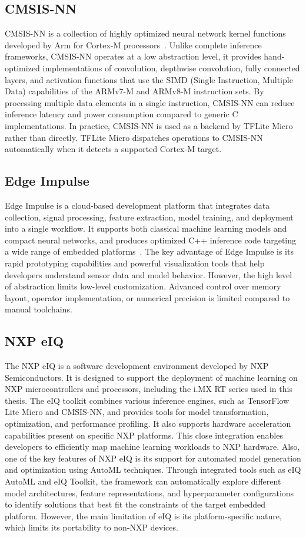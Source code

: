 \subsection{CMSIS-NN}

CMSIS-NN is a collection of highly optimized neural network kernel functions developed by Arm for Cortex-M processors~\cite{cmsisnn}. Unlike complete inference frameworks, CMSIS-NN operates at a low abstraction level, it provides hand-optimized implementations of convolution, depthwise convolution, fully connected layers, and activation functions that use the SIMD (Single Instruction, Multiple Data) capabilities of the ARMv7-M and ARMv8-M instruction sets. By processing multiple data elements in a single instruction, CMSIS-NN can reduce inference latency and power consumption compared to generic C implementations. 
In practice, CMSIS-NN is used as a backend by TFLite Micro rather than directly. TFLite Micro dispatches operations to CMSIS-NN automatically when it detects a supported Cortex-M target.

\subsection{Edge Impulse}
Edge Impulse is a cloud-based development platform that integrates data collection, signal processing, feature extraction, model training, and deployment into a single workflow. It supports both classical machine learning models and compact neural networks, and produces optimized C++ inference code targeting a wide range of embedded platforms~\cite{edgeimpulse}. The key advantage of Edge Impulse is its rapid prototyping capabilities and powerful visualization tools that help developers understand sensor data and model behavior. However, the high level of abstraction limits low-level customization. Advanced control over memory layout, operator implementation, or numerical precision is limited compared to manual toolchains.

\subsection{NXP eIQ}
The NXP eIQ is a software development environment developed by NXP Semiconductors. It is designed to support the deployment of machine learning on NXP microcontrollers and processors, including the i.MX RT series used in this thesis. The eIQ toolkit combines various inference engines, such as TensorFlow Lite Micro and CMSIS-NN, and provides tools for model transformation, optimization, and performance profiling. It also supports hardware acceleration capabilities present on specific NXP platforms. This close integration enables developers to efficiently map machine learning workloads to NXP hardware. Also, one of the key features of NXP eIQ is its support for automated model generation and optimization using AutoML techniques. Through integrated tools such as eIQ AutoML and eIQ Toolkit, the framework can automatically explore different model architectures, feature representations, and hyperparameter configurations to identify solutions that best fit the constraints of the target embedded platform. However, the main limitation of eIQ is its platform-specific nature, which limits its portability to non-NXP devices\cite{nxpeiq}.

